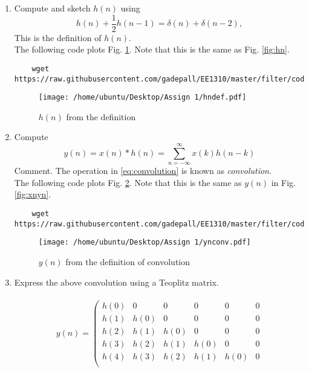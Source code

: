 \documentclass[journal,12pt,twocolumn]{IEEEtran}
\renewcommand\thesection{\arabic{section}}
\begin{document}
\begin{enumerate}[label=\thesection.\arabic*]
\item 
Compute and sketch $h(n)$ using 
\begin{equation}
	\label{eq:iir_filter_h}
	h(n) + \frac{1}{2}h(n-1) = \delta(n) + \delta(n-2), 
\end{equation}
%
This is the definition of $h(n)$.
\\
\solution The following code plots Fig. \ref{fig:hndef}. Note that this is the same as Fig. 
\ref{fig:hn}. 
%
\begin{lstlisting}
	wget https://raw.githubusercontent.com/gadepall/EE1310/master/filter/codes/hndef.py
\end{lstlisting}
\begin{figure}[!ht]
	\centering
	\texttt{[image: /home/ubuntu/Desktop/Assign 1/hndef.pdf]}
	\caption{$h(n)$ from the definition}
	\label{fig:hndef}
\end{figure}
%
\item Compute 
%
\begin{equation}
	\label{eq:convolution}
	y(n) = x(n)*h(n) = \sum_{n=-\infty}^{\infty}x(k)h(n-k)
\end{equation}
%
Comment. The operation in \eqref{eq:convolution} is known as
{\em convolution}.
%
\\
\solution The following code plots Fig. \ref{fig:ynconv}. Note that this is the same as 
$y(n)$ in  Fig. 
\ref{fig:xnyn}. 
%
\begin{lstlisting}
	wget https://raw.githubusercontent.com/gadepall/EE1310/master/filter/codes/ynconv.py
\end{lstlisting}
\begin{figure}[!ht]
	\centering
	\texttt{[image: /home/ubuntu/Desktop/Assign 1/ynconv.pdf]}
	\caption{$y(n)$ from the definition of convolution}
	\label{fig:ynconv}
\end{figure}
\item Express the above convolution using a Teoplitz matrix. \\
\solution \\
\begin{equation}
	y(n) = 
	\left(
	\begin{smallmatrix}
		h(0) & 0 & 0 & 0 & 0 & 0 \\
		h(1) & h(0) & 0 & 0 & 0 & 0 \\
		h(2) & h(1) & h(0) & 0 & 0 & 0 \\
		h(3) & h(2) & h(1) & h(0) & 0 & 0 \\
		h(4) & h(3) & h(2) & h(1) & h(0) & 0 \\

\end{smallmatrix}
\end{equation}
\end{enumerate}
\end{document}
